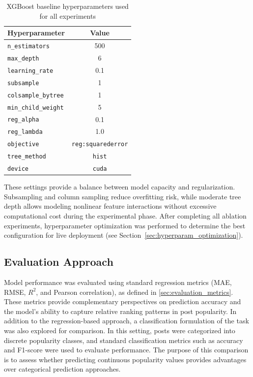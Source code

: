 \begin{table}[htbp]
\centering
\caption{XGBoost baseline hyperparameters used for all experiments}
\label{tab:xgb_baseline_params}
\begin{tabular}{lc}
\toprule
\textbf{Hyperparameter} & \textbf{Value} \\
\midrule
\texttt{n\_estimators} & 500 \\
\texttt{max\_depth} & 6 \\
\texttt{learning\_rate} & 0.1 \\
\texttt{subsample} & 1 \\
\texttt{colsample\_bytree} & 1 \\
\addlinespace
\texttt{min\_child\_weight} & 5 \\
\texttt{reg\_alpha} & 0.1 \\
\texttt{reg\_lambda} & 1.0 \\
\texttt{objective} & \texttt{reg:squarederror} \\
\texttt{tree\_method} & \texttt{hist} \\
\texttt{device} & \texttt{cuda} \\
\bottomrule
\end{tabular}
\end{table}

These settings provide a balance between model capacity and regularization. Subsampling and column sampling reduce overfitting risk, while moderate tree depth allows modeling nonlinear feature interactions without excessive computational cost during the experimental phase. After completing all ablation experiments, hyperparameter optimization was performed to determine the best configuration for live deployment (see Section~\ref{sec:hyperparam_optimization}).

\subsection{Evaluation Approach}

Model performance was evaluated using standard regression metrics (MAE, RMSE, $R^2$, and Pearson correlation), as defined in \autoref{sec:evaluation_metrics}. These metrics provide complementary perspectives on prediction accuracy and the model's ability to capture relative ranking patterns in post popularity.
In addition to the regression-based approach, a classification formulation of the task was also explored for comparison. In this setting, posts were categorized into discrete popularity classes, and standard classification metrics such as accuracy and F1-score were used to evaluate performance. The purpose of this comparison is to assess whether predicting continuous popularity values provides advantages over categorical prediction approaches.

